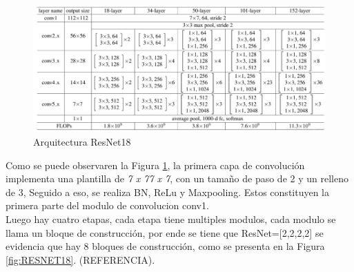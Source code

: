 				\begin{figure}[ht]
					\centering
					\includegraphics[scale=0.65]{Figs/68.png}
					\caption{Arquitectura ResNet18}
					\label{fig:ArqRes18}
				\end{figure}
				
				Como se puede observaren la Figura \ref{fig:ArqRes18}, la primera capa de convolución implementa una plantilla de \textit{7 x 77 x 7}, con un tamaño de paso de 2 y un relleno de 3, Seguido a eso, se realiza BN, ReLu y Maxpooling. Estos constituyen la primera parte del modulo de convolucion conv1.
				\\
				Luego hay cuatro etapas, cada etapa tiene multiples modulos, cada modulo se llama un bloque de construcción, por ende se tiene que ResNet=[2,2,2,2] se evidencia que hay 8 bloques de construcción, como se presenta en la Figura \ref{fig:RESNET18}. (REFERENCIA).
\newpage				
